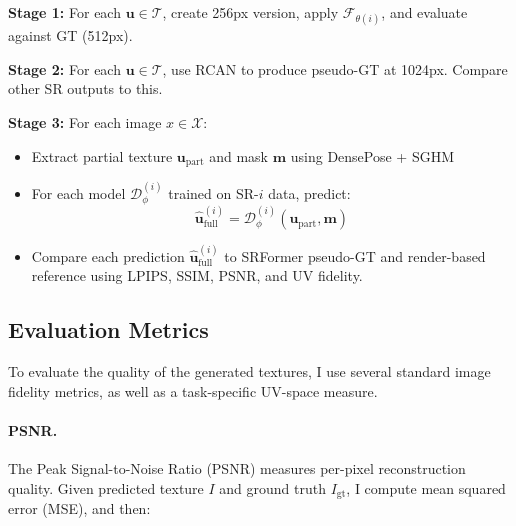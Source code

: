 \begin{algorithm}[t]
\caption{Three-Stage Evaluation for HRHumanTex}
\label{alg:full_pipeline_eval}
\DontPrintSemicolon


\vspace{4pt}
\textbf{Stage 1:} For each $\mathbf{u} \in \mathcal{T}$, create 256px version, apply $\mathcal{F}_{\theta(i)}$, and evaluate against GT (512px).

\vspace{4pt}
\textbf{Stage 2:} For each $\mathbf{u} \in \mathcal{T}$, use RCAN to produce pseudo-GT at 1024px. Compare other SR outputs to this.

\vspace{4pt}
\textbf{Stage 3:} For each image $x \in \mathcal{X}$:

\Indp
\begin{itemize}
\item Extract partial texture $\mathbf{u}_{\text{part}}$ and mask $\mathbf{m}$ using DensePose + SGHM
\item For each model $\mathcal{D}^{(i)}_\phi$ trained on SR-$i$ data, predict:
$$\hat{\mathbf{u}}_{\text{full}}^{(i)} = \mathcal{D}^{(i)}_\phi(\mathbf{u}_{\text{part}}, \mathbf{m})$$
\item Compare each prediction $\hat{\mathbf{u}}_{\text{full}}^{(i)}$ to SRFormer pseudo-GT and render-based reference using LPIPS, SSIM, PSNR, and UV fidelity.
\end{itemize}
\Indm

\end{algorithm}


\subsection{Evaluation Metrics}

To evaluate the quality of the generated textures, I use several standard image fidelity metrics, as well as a task-specific UV-space measure.

\paragraph{PSNR.} The Peak Signal-to-Noise Ratio (PSNR) measures per-pixel reconstruction quality. Given predicted texture $I$ and ground truth $I_{\text{gt}}$, I compute mean squared error (MSE), and then:

